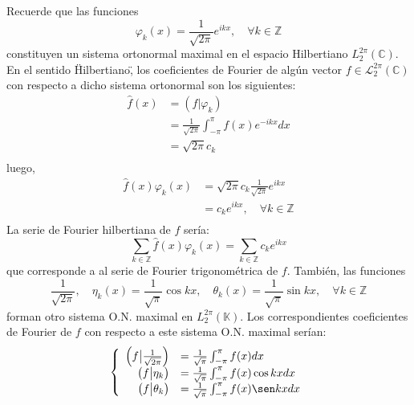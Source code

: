 \documentclass[12pt]{report}
\newcounter{it}
\theoremstyle{largebreak}
\newcommand\pint[2]{\ensuremath{\left(#1\big| #2\right)}}
\begin{document}
    Recuerde que las funciones
    \begin{equation*}
        \varphi_k(x)=\frac{1}{\sqrt{2\pi}}e^{ ikx},\quad\forall k\in\mathbb{Z}
    \end{equation*}
    constituyen un sistema ortonormal maximal en el espacio Hilbertiano $L_2^{2\pi}(\mathbb{C})$. En el sentido \"Hilbertiano\", los coeficientes de Fourier de algún vector $f\in\mathcal{L}_2^{2\pi}(\mathbb{C})$ con respecto a dicho sistema ortonormal son los siguientes:
    \begin{equation*}
        \begin{split}
            \hat{f}(x)&=\pint{f}{\varphi_k}\\
            &=\frac{1}{\sqrt{2\pi}}\int_{-\pi}^{\pi}f(x)e^{ -ikx}dx\\
            &=\sqrt{2\pi}c_k\\
        \end{split}
    \end{equation*}
    luego, 
    \begin{equation*}
        \begin{split}
            \hat{f}(x)\varphi_k(x)&=\sqrt{2\pi}c_k\frac{1}{\sqrt{2\pi}}e^{ ikx}\\
            &=c_ke^{ ikx},\quad\forall k\in\mathbb{Z}\\
        \end{split}
    \end{equation*}
    La serie de Fourier hilbertiana de $f$ sería:
    \begin{equation*}
        \sum_{ k\in\mathbb{Z}}\hat{f}(x)\varphi_k(x)=\sum_{k\in\mathbb{Z}}c_ke^{ ikx}
    \end{equation*}
    que corresponde a al serie de Fourier trigonométrica de $f$. También, las funciones
    \begin{equation*}
        \frac{1}{\sqrt{2\pi}},\quad \eta_k(x)=\frac{1}{\sqrt{\pi}}\cos kx,\quad\theta_k(x)=\frac{1}{\sqrt{\pi}}\sin kx,\quad \forall k\in\mathbb{Z}
    \end{equation*}
    forman otro sistema O.N. maximal en $L_2^{2\pi}(\mathbb{K})$. Los correspondientes coeficientes de Fourier de $f$ con respecto a este sistema O.N. maximal serían:
    \begin{equation*}
        \left\{
            \begin{array}{rl}
                \pint{f}{\frac{1}{\sqrt{2\pi}}}&=\frac{1}{\sqrt{\pi}}\int_{-\pi}^{\pi}f(x)dx\\
                \pint{f}{\eta_k}&=\frac{1}{\sqrt{\pi}}\int_{-\pi}^{\pi}f(x)\cos kxdx \\
                \pint{f}{\theta_k}&=\frac{1}{\sqrt{\pi}}\int_{-\pi}^{\pi}f(x)\sen kxdx \\
            \end{array}
        \right.
    \end{equation*}
\end{document}
